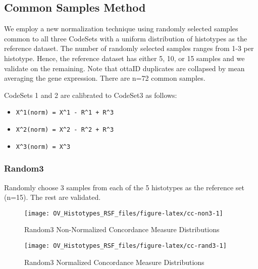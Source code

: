 \documentclass[
]{report}
\providecommand{\tightlist}{%
  \setlength{\itemsep}{0pt}\setlength{\parskip}{0pt}}
\begin{document}
\hypertarget{common-samples-method-1}{%
\subsection{Common Samples Method}\label{common-samples-method-1}}

We employ a new normalization technique using randomly selected samples common to all three CodeSets with a uniform distribution of histotypes as the reference dataset. The number of randomly selected samples ranges from 1-3 per histotype. Hence, the reference dataset has either 5, 10, or 15 samples and we validate on the remaining. Note that ottaID duplicates are collapsed by mean averaging the gene expression. There are n=72 common samples.

CodeSets 1 and 2 are calibrated to CodeSet3 as follows:

\begin{itemize}
\tightlist
\item
  \texttt{X\^{}1(norm)\ =\ X\^{}1\ -\ R\^{}1\ +\ R\^{}3}~\\
\item
  \texttt{X\^{}2(norm)\ =\ X\^{}2\ -\ R\^{}2\ +\ R\^{}3}~\\
\item
  \texttt{X\^{}3(norm)\ =\ X\^{}3}
\end{itemize}

\hypertarget{random3}{%
\subsubsection{Random3}\label{random3}}

Randomly choose 3 samples from each of the 5 histotypes as the reference set (n=15). The rest are validated.

\begin{figure}[H]

{\centering \texttt{[image: OV\_Histotypes\_RSF\_files/figure-latex/cc-non3-1]} 

}

\caption{Random3 Non-Normalized Concordance Measure Distributions}\label{fig:cc-non3}
\end{figure}

\begin{figure}[H]

{\centering \texttt{[image: OV\_Histotypes\_RSF\_files/figure-latex/cc-rand3-1]} 

}

\caption{Random3 Normalized Concordance Measure Distributions}\label{fig:cc-rand3}
\end{figure}
\end{document}
